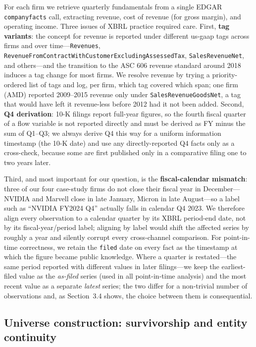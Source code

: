 \documentclass[11pt]{article}
\begin{document}
For each firm we retrieve quarterly fundamentals from a single EDGAR \texttt{companyfacts} call, extracting revenue, cost of revenue (for gross margin), and operating income. Three issues of XBRL practice required care. First, \textbf{tag variants}: the concept for revenue is reported under different us-gaap tags across firms and over time---\texttt{Revenues}, \texttt{Revenue\allowbreak From\allowbreak Contract\allowbreak With\allowbreak Customer\allowbreak Excluding\allowbreak Assessed\allowbreak Tax}, \texttt{SalesRevenueNet}, and others---and the transition to the ASC 606 revenue standard around 2018 induces a tag change for most firms. We resolve revenue by trying a priority-ordered list of tags and log, per firm, which tag covered which span; one firm (AMD) reported 2009--2015 revenue only under \texttt{SalesRevenueGoodsNet}, a tag that would have left it revenue-less before 2012 had it not been added. Second, \textbf{Q4 derivation}: 10-K filings report full-year figures, so the fourth fiscal quarter of a flow variable is not reported directly and must be derived as FY minus the sum of Q1--Q3; we always derive Q4 this way for a uniform information timestamp (the 10-K date) and use any directly-reported Q4 facts only as a cross-check, because some are first published only in a comparative filing one to two years later.

Third, and most important for our question, is the \textbf{fiscal-calendar mismatch}: three of our four case-study firms do not close their fiscal year in December---NVIDIA and Marvell close in late January, Micron in late August---so a label such as ``NVIDIA FY2024 Q4'' actually falls in calendar Q4 2023. We therefore align every observation to a calendar quarter by its XBRL period-end date, not by its fiscal-year/period label; aligning by label would shift the affected series by roughly a year and silently corrupt every cross-channel comparison. For point-in-time correctness, we retain the \texttt{filed} date on every fact as the timestamp at which the figure became public knowledge. Where a quarter is restated---the same period reported with different values in later filings---we keep the earliest-filed value as the \emph{as-filed} series (used in all point-in-time analysis) and the most recent value as a separate \emph{latest} series; the two differ for a non-trivial number of observations and, as Section~3.4 shows, the choice between them is consequential.

\subsection{Universe construction: survivorship and entity continuity}
\end{document}
